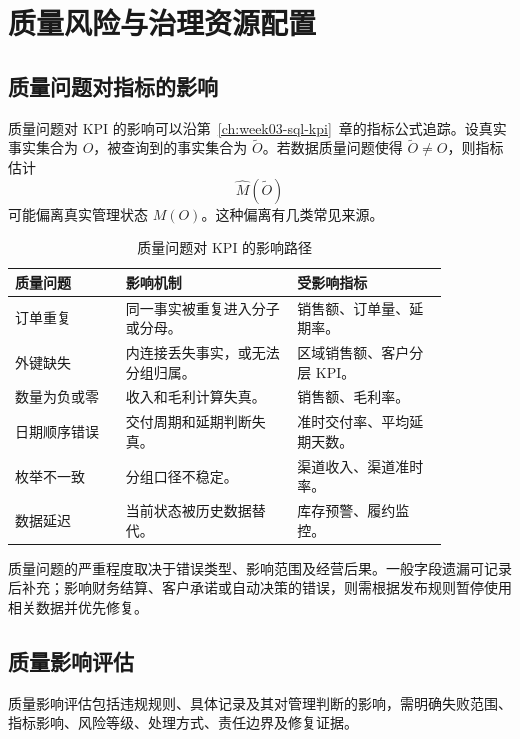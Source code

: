 \section{质量风险与治理资源配置}
\subsection{质量问题对指标的影响}

质量问题对 KPI 的影响可以沿第~\ref{ch:week03-sql-kpi}~章的指标公式追踪。设真实事实集合为 \(O\)，被查询到的事实集合为 \(\tilde O\)。若数据质量问题使得 \(\tilde O\ne O\)，则指标估计
\[
\hat M(\tilde O)
\]
可能偏离真实管理状态 \(M(O)\)。这种偏离有几类常见来源。

\begin{table}[htbp]
\centering
\caption{质量问题对 KPI 的影响路径}
\begin{tabular}{P{0.22\linewidth}P{0.34\linewidth}P{0.30\linewidth}}
\toprule
{}
质量问题 & 影响机制 & 受影响指标\\
\midrule
订单重复 & 同一事实被重复进入分子或分母。 & 销售额、订单量、延期率。\\
外键缺失 & 内连接丢失事实，或无法分组归属。 & 区域销售额、客户分层 KPI。\\
数量为负或零 & 收入和毛利计算失真。 & 销售额、毛利率。\\
日期顺序错误 & 交付周期和延期判断失真。 & 准时交付率、平均延期天数。\\
枚举不一致 & 分组口径不稳定。 & 渠道收入、渠道准时率。\\
数据延迟 & 当前状态被历史数据替代。 & 库存预警、履约监控。\\
\bottomrule
\end{tabular}
\end{table}

质量问题的严重程度取决于错误类型、影响范围及经营后果。一般字段遗漏可记录后补充；影响财务结算、客户承诺或自动决策的错误，则需根据发布规则暂停使用相关数据并优先修复。

\subsection{质量影响评估}

质量影响评估包括违规规则、具体记录及其对管理判断的影响，需明确失败范围、指标影响、风险等级、处理方式、责任边界及修复证据。


